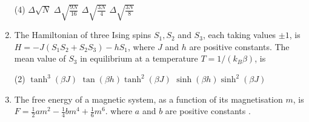 \begin{enumerate}
 \begin{tasks}(4)
	\task[\textbf{a.}]$\Delta \sqrt{N}$
	\task[\textbf{b.}] $\Delta \sqrt{\frac{9 N}{16}}$
	\task[\textbf{c.}]$\Delta \sqrt{\frac{3 N}{4}}$
	\task[\textbf{d.}] $\Delta \sqrt{\frac{3 N}{8}}$
\end{tasks}
\item The Hamiltonian of three Ising spins $S_{1}, S_{2}$ and $S_{3}$, each taking values $\pm 1$, is $H=-J\left(S_{1} S_{2}+S_{2} S_{3}\right)-h S_{1}$, where $J$ and $h$ are positive constants. The mean value of $S_{3}$ in equilibrium at a temperature $T=1 /\left(k_{B} \beta\right)$, is
 \begin{tasks}(2)
	\task[\textbf{a.}]$\tanh ^{3}(\beta J)$
	\task[\textbf{b.}]$\tan (\beta h) \tanh ^{2}(\beta J)$
	\task[\textbf{c.}]$\sinh (\beta h) \sinh ^{2}(\beta J)$
\end{tasks}
\item The free energy of a magnetic system, as a function of its magnetisation $m$, is $F=\frac{1}{2} a m^{2}-\frac{1}{4} b m^{4}+\frac{1}{6} m^{6}$. where $a$ and $b$ are positive constants $.$


\end{enumerate}

